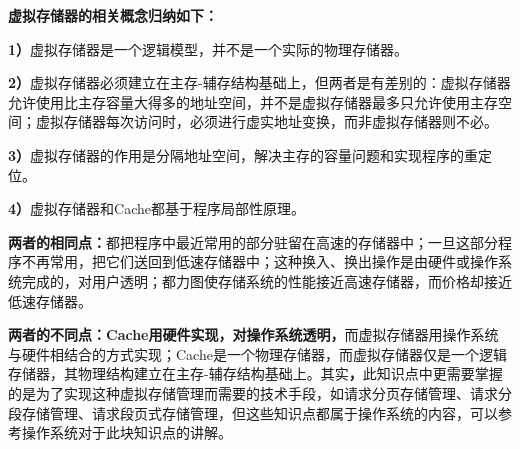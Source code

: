 {\textbf{{虚拟存储器的相关概念归纳如下：}} }

{\textbf{{1）}}{虚拟存储器是一个逻辑模型，}并不是一个实际的物理存储器。}

{{\textbf{2）}虚拟存储器必须建立在主存-辅存结构基础上，}但两者是有差别的：虚拟存储器允许使用比主存容量大得多的地址空间，并不是虚拟存储器最多只允许使用主存空间；虚拟存储器每次访问时，必须进行虚实地址变换，而非虚拟存储器则不必。}

{\textbf{3）}虚拟存储器的作用是分隔地址空间，解决主存的容量问题和实现程序的重定位。}

{\textbf{4）}虚拟存储器和Cache都基于程序局部性原理。}

{\textbf{两者的相同点：}都把程序中最近常用的部分驻留在高速的存储器中；一旦这部分程序不再常用，把它们送回到低速存储器中；这种换入、换出操作是由硬件或操作系统完成的，对用户透明；都力图使存储系统的性能接近高速存储器，而价格却接近低速存储器。}

{\textbf{两者的不同点：Cache用硬件实现，对操作系统透明，}而虚拟存储器用操作系统与硬件相结合的方式实现；Cache是一个物理存储器，而虚拟存储器仅是一个逻辑存储器，其物理结构建立在主存-辅存结构基础上。其实\textbf{，}此知识点中更需要掌握的是为了实现这种虚拟存储管理而需要的技术手段，如请求分页存储管理、请求分段存储管理、请求段页式存储管理，但这些知识点都属于操作系统的内容，可以参考操作系统对于此块知识点的讲解。}
